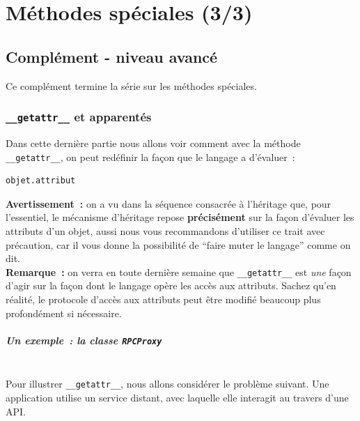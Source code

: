     \hypertarget{muxe9thodes-spuxe9ciales-33}{%
\section{Méthodes spéciales (3/3)}\label{muxe9thodes-spuxe9ciales-33}}

    \hypertarget{compluxe9ment---niveau-avancuxe9}{%
\subsection{Complément - niveau
avancé}\label{compluxe9ment---niveau-avancuxe9}}

    Ce complément termine la série sur les méthodes spéciales.

    \hypertarget{getattr__-et-apparentuxe9s}{%
\subsubsection{\texorpdfstring{\texttt{\_\_getattr\_\_} et
apparentés}{\_\_getattr\_\_ et apparentés}}\label{getattr__-et-apparentuxe9s}}

    Dans cette dernière partie nous allons voir comment avec la méthode
\texttt{\_\_getattr\_\_}, on peut redéfinir la façon que le langage a
d'évaluer~:

\begin{verbatim}
objet.attribut
\end{verbatim}

    \textbf{Avertissement~:} on a vu dans la séquence consacrée à l'héritage
que, pour l'essentiel, le mécanisme d'héritage repose
\textbf{précisément} sur la façon d'évaluer les attributs d'un objet,
aussi nous vous recommandons d'utiliser ce trait avec précaution, car il
vous donne la possibilité de ``faire muter le langage'' comme on dit.\\

    \textbf{Remarque~:} on verra en toute dernière semaine que
\texttt{\_\_getattr\_\_} est \emph{une} façon d'agir sur la façon dont
le langage opère les accès aux attributs. Sachez qu'en réalité, le
protocole d'accès aux attributs peut être modifié beaucoup plus
profondément si nécessaire.

    \hypertarget{un-exemple-la-classe-rpcproxy}{%
\subparagraph{\texorpdfstring{Un exemple~: la classe
\texttt{RPCProxy}}{Un exemple~: la classe RPCProxy}\\\\}\label{un-exemple-la-classe-rpcproxy}}

    Pour illustrer \texttt{\_\_getattr\_\_}, nous allons considérer le
problème suivant. Une application utilise un service distant, avec
laquelle elle interagit au travers d'une API.\\

